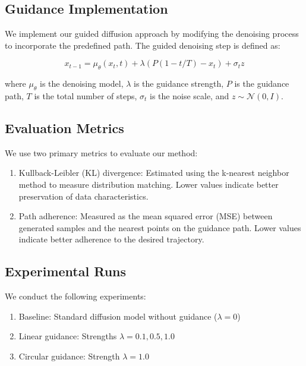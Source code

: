 \documentclass{article} %
\begin{document}
\subsection{Guidance Implementation}

We implement our guided diffusion approach by modifying the denoising process to incorporate the predefined path. The guided denoising step is defined as:

\begin{equation}
    x_{t-1} = \mu_\theta(x_t, t) + \lambda(P(1-t/T) - x_t) + \sigma_t z
\end{equation}

where $\mu_\theta$ is the denoising model, $\lambda$ is the guidance strength, $P$ is the guidance path, $T$ is the total number of steps, $\sigma_t$ is the noise scale, and $z \sim \mathcal{N}(0, I)$.

\subsection{Evaluation Metrics}

We use two primary metrics to evaluate our method:

\begin{enumerate}
    \item Kullback-Leibler (KL) divergence: Estimated using the k-nearest neighbor method \cite{vae} to measure distribution matching. Lower values indicate better preservation of data characteristics.
    \item Path adherence: Measured as the mean squared error (MSE) between generated samples and the nearest points on the guidance path. Lower values indicate better adherence to the desired trajectory.
\end{enumerate}

\subsection{Experimental Runs}

We conduct the following experiments:

\begin{enumerate}
    \item Baseline: Standard diffusion model without guidance ($\lambda = 0$)
    \item Linear guidance: Strengths $\lambda = 0.1, 0.5, 1.0$
    \item Circular guidance: Strength $\lambda = 1.0$
\end{enumerate}
\end{document}
